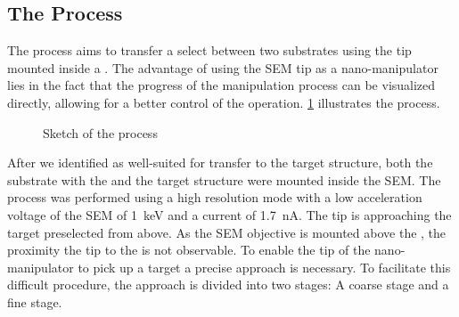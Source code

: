 	\subsection{The \PP Process}

			The \pp process aims to transfer a select \nd between two substrates using the tip mounted inside a \sem. The advantage of using the SEM tip as a nano-manipulator lies in the fact that the progress of the manipulation process can be visualized directly, allowing for a better control of the operation. \cref{fig::pp_sketch} illustrates the process.

			\begin{figure}[htp]
				\centering
				\caption{Sketch of the \pp process}
				\label{fig::pp_sketch}
			\end{figure}

	After we identified \nds as well-suited for transfer to the target structure, both the substrate with the \nds and the target structure were mounted inside the SEM.
	The process was performed using a high resolution mode with a low acceleration voltage of the SEM of \SI{1}{\kilo\electronvolt} and a current of \SI{1.7}{\nano\ampere}.
	The tip is approaching the target preselected \nd from above.
	As the SEM objective is mounted above the \np, the proximity the \np tip  to the \nd is not observable.
	To enable the tip of the nano-manipulator to pick up a target \nd a precise approach is necessary. To facilitate this difficult procedure, the approach is divided into two stages: A coarse stage and a fine stage.

